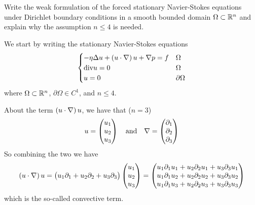 \newpage
\begin{exercise}
    Write the weak formulation of the forced stationary Navier-Stokes equations under Dirichlet boundary conditions in a smooth bounded domain \(\Omega \subset \mathbb{R}^n\) and explain why the assumption \(n \leq 4\) is needed.
\end{exercise}
We start by writing the stationary Navier-Stokes equations
\[
    \begin{cases}
        - \eta \Delta u + \left( u \cdot \nabla \right) u + \nabla p = f & \Omega \\
        \text{div} u = 0 & \Omega \\
        u = 0 & \partial\Omega
    \end{cases}
\]
where \(\Omega \subset \mathbb{R}^n\), \(\partial\Omega \in C^1\), and \(n \leq 4\).
\begin{remark}
    About the term \(\left( u \cdot \nabla \right) u\), we have that (\(n = 3\))
    \[
        u = \begin{pmatrix}
            u_1 \\
            u_2 \\
            u_3
        \end{pmatrix} \quad \text{and} \quad \nabla = \begin{pmatrix}
            \partial_1 \\
            \partial_2 \\
            \partial_3
        \end{pmatrix}
    \]
    So combining the two we have
    \[
        \begin{split}
            \left( u \cdot \nabla \right) u = \begin{pmatrix}
                u_1 \partial_1 + u_2 \partial_2 + u_3 \partial_3
            \end{pmatrix} \begin{pmatrix}
                u_1 \\
                u_2 \\
                u_3
            \end{pmatrix} = \begin{pmatrix}
                u_1 \partial_1 u_1 + u_2 \partial_2 u_1 + u_3 \partial_3 u_1 \\
                u_1 \partial_1 u_2 + u_2 \partial_2
                u_2 + u_3 \partial_3 u_2 \\
                u_1 \partial_1 u_3 + u_2 \partial_2 u_3 + u_3 \partial_3 u_3
            \end{pmatrix}
        \end{split}
    \]
    which is the so-called convective term.
\end{remark}

